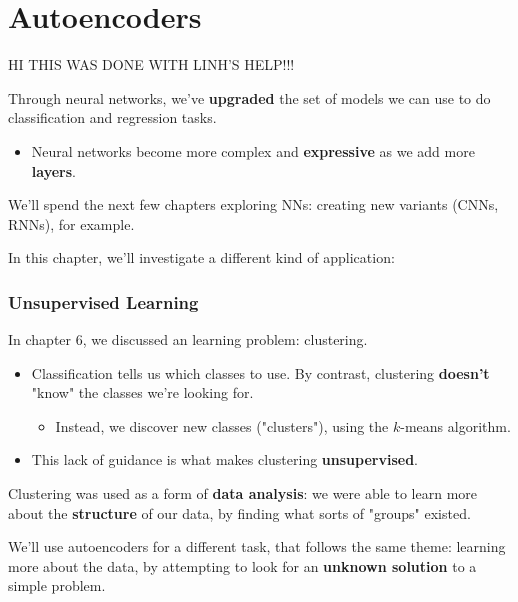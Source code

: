 \setcounter{chapter}{13-1}

\chapter{Autoencoders}

    HI THIS WAS DONE WITH LINH'S HELP!!!

    Through neural networks, we've \textbf{upgraded} the set of models we can use to do classification and regression tasks.

    \begin{itemize}
        \item Neural networks become more complex and \textbf{expressive} as we add more \textbf{layers}.
    \end{itemize}

    We'll spend the next few chapters exploring NNs: creating new variants (CNNs, RNNs), for example.
    
    In this chapter, we'll investigate a different kind of application: 

    \subsection{Unsupervised Learning}

        In chapter 6, we discussed an  learning problem: clustering.

        \begin{itemize}
            \item Classification tells us which classes to use. By contrast, clustering \textbf{doesn't} "know" the classes we're looking for.

            \begin{itemize}
                \item Instead, we discover new classes ("clusters"), using the $k$-means algorithm.
            \end{itemize}
            
            \item This lack of guidance is what makes clustering \textbf{unsupervised}.
        \end{itemize}

        Clustering was used as a form of \textbf{data analysis}: we were able to learn more about the \textbf{structure} of our data, by finding what sorts of "groups" existed.

        We'll use autoencoders for a different task, that follows the same theme: learning more about the data, by attempting to look for an \textbf{unknown solution} to a simple problem.

